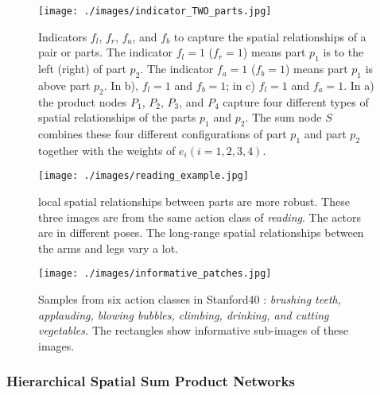 \documentclass[journal]{IEEEtran}
\begin{document}
\begin{figure}[h]
	\begin{center}
		\texttt{[image: ./images/indicator\_TWO\_parts.jpg]}
	\end{center}
	\caption{Indicators $ f_l $, $ f_r $, $ f_a $, and $ f_b $ to capture the spatial relationships of a pair or parts. The indicator $ f_l=1  $ ($ f_r=1 $) means part $ p_1 $ is to the left (right) of part $ p_2 $. The indicator $ f_a=1 $ ($ f_b=1 $) means part $ p_1 $ is above part $ p_2 $. In b), $ f_l=1 $ and $ f_b=1 $; in c) $ f_l=1 $ and $ f_a=1 $. In a) the product nodes $ P_1 $, $ P_2 $, $ P_3 $, and $ P_4 $ capture four different types of spatial relationships of the parts $ p_1 $ and $ p_2 $. The sum node $ S $ combines these four different configurations of part $ p_1 $ and part $ p_2 $ together with the weights of $ e_i (i=1,2,3,4)$. }
	\label{fig:IndicatorforTwoparts}
\end{figure}



\begin{figure}[htb]
	\begin{center}
		\texttt{[image: ./images/reading\_example.jpg]}
	\end{center}
	\caption{local spatial relationships between parts are more robust. These three images are from the same action class of \textit{reading}. The actors are in different poses. The long-range spatial relationships between the arms and legs vary a lot.}
	\label{fig:reading_example}
\end{figure}




\begin{figure*}[htb]
	\begin{center}
		\texttt{[image: ./images/informative\_patches.jpg]}
	\end{center}
	\caption{Samples from six action classes in Stanford40 \cite{Yao11humanaction__Stanford40}: \textit{brushing teeth, applauding, blowing bubbles, climbing, drinking, and cutting vegetables.} The rectangles show informative sub-images of these images.}
	\label{fig:informativePatches}
\end{figure*}



\subsubsection{Hierarchical Spatial Sum Product Networks}
\end{document}
